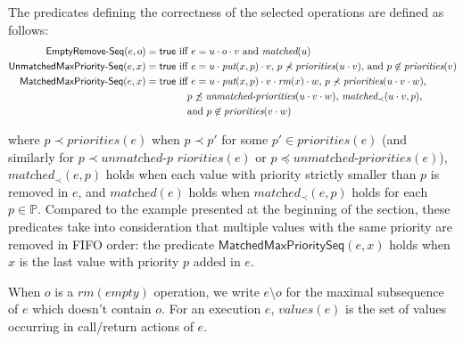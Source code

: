 The predicates defining the correctness of the selected operations are defined as follows:
{\small
\begin{align*}
\mathsf{EmptyRemove\text{-}Seq}(e,o)=\mathsf{true} & \mbox{ iff  $e= u\cdot o\cdot v$ and $\textit{matched}(u)$} \\
\mathsf{UnmatchedMaxPriority\text{-}Seq}(e,x)=\mathsf{true} & \mbox{ iff  $e= u\cdot \textit{put}(x,p)\cdot v$, $p\not\prec \textit{priorities}(u\cdot v)$, and $p\not\in \textit{priorities}(v)$} \\
\mathsf{MatchedMaxPriority\text{-}Seq}(e,x)=\mathsf{true} & \mbox{ iff  $e= u\cdot \textit{put}(x,p)\cdot v\cdot \textit{rm}(x)\cdot w$, $p\not\prec \textit{priorities}(u\cdot v\cdot w)$,} \\
&\hspace{4mm}\mbox{$p\not\preceq \textit{unmatched-priorities}(u\cdot v\cdot w)$, $\textit{matched}_\prec(u\cdot v,p)$,} \\
&\hspace{4mm}\mbox{and $p\not\in \textit{priorities}(v\cdot w)$}
\end{align*}
}

\vspace{-3mm}
\noindent
where $p\prec \textit{priorities}(e)$ when $p\prec p'$ for some $p'\in \textit{priorities}(e)$ (and similarly for $p\prec \textit{unmatched-p}$ $\textit{riorities}(e)$ or $p\preceq \textit{unmatched-priorities}(e)$),
$\textit{matched}_\prec(e,p)$ holds when each value with priority strictly smaller than $p$ is removed in $e$, and $\textit{matched}(e)$ holds when $\textit{matched}_\prec(e,p)$ holds for each $p\in\mathbb{P}$. Compared to the example presented at the beginning of the section, these predicates take into consideration that multiple values with the same priority are removed in FIFO order: the predicate $\mathsf{MatchedMaxPrioritySeq}(e,x)$ holds when $x$ is the last value with priority $p$ added in $e$.

When $o$ is a $\textit{rm}(\textit{empty})$ operation, we write $e\setminus o$ for the maximal subsequence of $e$ which doesn't contain $o$. For an execution $e$, $\textit{values}(e)$ is the set of values occurring in call/return actions of $e$.


